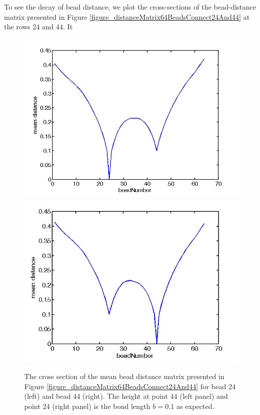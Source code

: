 \documentclass[12pt]{book}
\begin{document}
To see the decay of bead distance, we plot the cross-sections of the bead-distance matrix presented in Figure \ref{figure_distanceMatrix64BeadsConnect24And44} at the rows 24 and 44. It 
\begin{figure}[H]
\includegraphics[scale=0.3]{crossectionAtRow24DistanceMatrix64BeadsConnect24And44}
\includegraphics[scale=0.32]{crossectionAtRow44DistanceMatrix64BeadsConnect24And44}
\caption{\scriptsize{The cross section of the mean bead distance matrix presented in Figure \ref{figure_distanceMatrix64BeadsConnect24And44} for bead 24 (left) and bead 44 (right). The height at point 44 (left panel) and point 24 (right panel) is the bond length $b=0.1$ as expected.}}
\label{figure_crossectionAtRow24DistanceMatrix64BeadsConnect24And44}
\end{figure}
\end{document}
